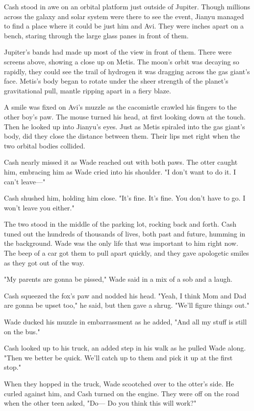 Cash stood in awe on an orbital platform just outside of Jupiter. Though millions across the galaxy and solar system were there to see the event, Jianyu managed to find a place where it could be just him and Avi. They were inches apart on a bench, staring through the large glass panes in front of them.

Jupiter's bands had made up most of the view in front of them. There were screens above, showing a close up on Metis. The moon's orbit was decaying so rapidly, they could see the trail of hydrogen it was dragging across the gas giant's face. Metis's body began to rotate under the sheer strength of the planet's gravitational pull, mantle ripping apart in a fiery blaze.

A smile was fixed on Avi's muzzle as the cacomistle crawled his fingers to the other boy's paw. The mouse turned his head, at first looking down at the touch. Then he looked up into Jianyu's eyes. Just as Metis spiraled into the gas giant's body, did they close the distance between them. Their lips met right when the two orbital bodies collided.

Cash nearly missed it as Wade reached out with both paws. The otter caught him, embracing him as Wade cried into his shoulder. "I don't want to do it. I can't leave---"

Cash shushed him, holding him close. "It's fine. It's fine. You don't have to go. I won't leave you either."

The two stood in the middle of the parking lot, rocking back and forth. Cash tuned out the hundreds of thousands of lives, both past and future, humming in the background. Wade was the only life that was important to him right now. The beep of a car got them to pull apart quickly, and they gave apologetic smiles as they got out of the way.

"My parents are gonna be pissed," Wade said in a mix of a sob and a laugh.

Cash squeezed the fox's paw and nodded his head. "Yeah, I think Mom and Dad are gonna be upset too," he said, but then gave a shrug. "We'll figure things out."

Wade ducked his muzzle in embarrassment as he added, "And all my stuff is still on the bus."

Cash looked up to his truck, an added step in his walk as he pulled Wade along. "Then we better be quick. We'll catch up to them and pick it up at the first stop."

When they hopped in the truck, Wade scootched over to the otter's side. He curled against him, and Cash turned on the engine. They were off on the road when the other teen asked, "Do--- Do you think this will work?"

